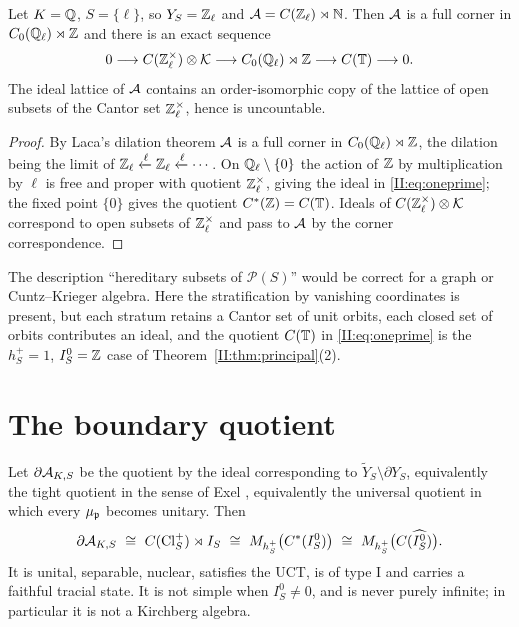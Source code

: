 \begin{proposition}\label{II:prop:lattice}
Let $K=\mathbb{Q}$, $S=\{\ell\}$, so $Y_S=\mathbb{Z}_\ell$ and $\mathcal{A}=C(\mathbb{Z}_\ell)\rtimes\mathbb{N}$. Then $\mathcal{A}$ is a
full corner in $C_0(\mathbb{Q}_\ell)\rtimes\mathbb{Z}$ and there is an exact sequence
\begin{equation}\label{II:eq:oneprime}
0\longrightarrow C(\mathbb{Z}_\ell^\times)\otimes\mathcal{K}\longrightarrow C_0(\mathbb{Q}_\ell)\rtimes\mathbb{Z}\longrightarrow C(\mathbb{T})\longrightarrow0 .
\end{equation}
The ideal lattice of $\mathcal{A}$ contains an order-isomorphic copy of the lattice of open subsets
of the Cantor set $\mathbb{Z}_\ell^\times$, hence is uncountable.
\end{proposition}

\begin{proof}
By Laca's dilation theorem $\mathcal{A}$ is a full corner in $C_0(\mathbb{Q}_\ell)\rtimes\mathbb{Z}$, the dilation
being the limit of $\mathbb{Z}_\ell\xleftarrow{\ell}\mathbb{Z}_\ell\xleftarrow{\ell}\cdots$. On
$\mathbb{Q}_\ell\setminus\{0\}$ the action of $\mathbb{Z}$ by multiplication by $\ell$ is free and proper
with quotient $\mathbb{Z}_\ell^\times$, giving the ideal in \eqref{II:eq:oneprime}; the fixed point
$\{0\}$ gives the quotient $C^*(\mathbb{Z})=C(\mathbb{T})$. Ideals of $C(\mathbb{Z}_\ell^\times)\otimes\mathcal{K}$
correspond to open subsets of $\mathbb{Z}_\ell^\times$ and pass to $\mathcal{A}$ by the corner
correspondence.
\end{proof}

\begin{remark}
The description ``hereditary subsets of $\mathcal P(S)$'' would be correct for a graph or
Cuntz--Krieger algebra. Here the stratification by vanishing coordinates is present, but
each stratum retains a Cantor set of unit orbits, each closed set of orbits contributes an
ideal, and the quotient $C(\mathbb{T})$ in \eqref{II:eq:oneprime} is the $h^+_S=1$, $I_S^0=\mathbb{Z}$ case of
Theorem~\ref{II:thm:principal}(2).
\end{remark}

\section{The boundary quotient}

\begin{theorem}\label{II:thm:boundary}
Let $\partial\mathcal{A}_{K,S}$ be the quotient by the ideal corresponding to
$\widetilde Y_S\setminus\partial Y_S$, equivalently the tight quotient in the sense of Exel
\cite{Exel}, equivalently the universal quotient in which every $\mu_{\mathfrak{p}}$ becomes unitary.
Then
\[
\partial\cA_{K,S}\ \cong\ C(\Cl^+_S)\rtimes I_S\ \cong\ M_{h^+_S}\bigl(C^*(I_S^0)\bigr)
\ \cong\ M_{h^+_S}\bigl(C(\widehat{I_S^0})\bigr).
\]
It is unital, separable, nuclear, satisfies the UCT, is of type $\mathrm I$ and carries a
faithful tracial state. It is not simple when $I_S^0\ne0$, and is never purely infinite; in
particular it is not a Kirchberg algebra.
\end{theorem}

